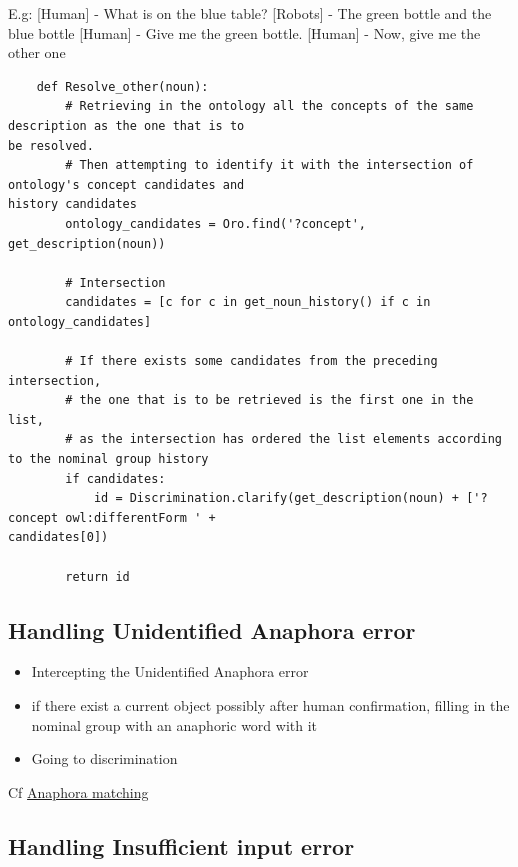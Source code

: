 \documentclass[twoside,a4paper,10pt]{report}
\begin{document}
\small
\begin{verbatimtab}
  E.g:
  [Human]  - What is on the blue table?
  [Robots] - The green bottle and the blue bottle
  [Human]  - Give me the green bottle.
  [Human]  - Now, give me the other one 
\end{verbatimtab}
\normalsize

\lstset{language=python}
\begin{lstlisting}
    def Resolve_other(noun):
        # Retrieving in the ontology all the concepts of the same description as the one that is to
be resolved.
        # Then attempting to identify it with the intersection of ontology's concept candidates and
history candidates
        ontology_candidates = Oro.find('?concept', get_description(noun))
        
        # Intersection
        candidates = [c for c in get_noun_history() if c in ontology_candidates]
        
        # If there exists some candidates from the preceding intersection, 
        # the one that is to be retrieved is the first one in the list,
        # as the intersection has ordered the list elements according to the nominal group history
        if candidates:
            id = Discrimination.clarify(get_description(noun) + ['?concept owl:differentForm ' +
candidates[0])
                
        return id

\end{lstlisting}

\subsection{Handling Unidentified Anaphora error}
\label{e79def79eebc0ce87924efaa796970ff}%

\begin{itemize}
    \item  Intercepting the Unidentified Anaphora error
    \item  if there exist a current object possibly after human confirmation, filling in the nominal group with an anaphoric word with it
    \item  Going to discrimination
\end{itemize}

Cf \hyperref[4873f0687cc3361050cff094f296df2d]{Anaphora matching}


\subsection{Handling Insufficient input error}
\label{a9b6979d4ccc758341445731028f7332}%
\end{document}
